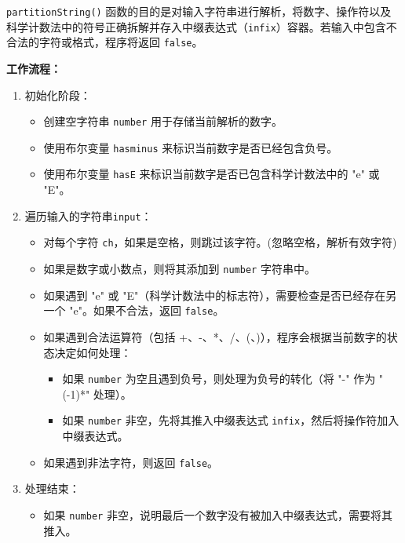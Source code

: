\documentclass[UTF8]{ctexart}
\begin{document}
\texttt{partitionString()} 函数的目的是对输入字符串进行解析，将数字、操作符以及科学计数法中的符号正确拆解并存入中缀表达式（\texttt{infix}）容器。若输入中包含不合法的字符或格式，程序将返回 \texttt{false}。

\textbf{工作流程：}
\begin{enumerate}
    \item 初始化阶段：
    \begin{itemize}
        \item 创建空字符串 \texttt{number} 用于存储当前解析的数字。
        \item 使用布尔变量 \texttt{hasminus} 来标识当前数字是否已经包含负号。
        \item 使用布尔变量 \texttt{hasE} 来标识当前数字是否已包含科学计数法中的 "e" 或 "E"。
    \end{itemize}

    \item 遍历输入的字符串\texttt{input}：
    \begin{itemize}
        \item 对每个字符 \texttt{ch}，如果是空格，则跳过该字符。(忽略空格，解析有效字符)
        \item 如果是数字或小数点，则将其添加到 \texttt{number} 字符串中。
        \item 如果遇到 "e" 或 "E"（科学计数法中的标志符），需要检查是否已经存在另一个 "e"。如果不合法，返回 \texttt{false}。
        \item 如果遇到合法运算符（包括 +、-、*、/、(、)），程序会根据当前数字的状态决定如何处理：
        \begin{itemize}
            \item 如果 \texttt{number} 为空且遇到负号，则处理为负号的转化（将 "-" 作为 "(-1)*" 处理）。
            \item 如果 \texttt{number} 非空，先将其推入中缀表达式 \texttt{infix}，然后将操作符加入中缀表达式。
        \end{itemize}
        \item 如果遇到非法字符，则返回 \texttt{false}。
    \end{itemize}

    \item 处理结束：
    \begin{itemize}
        \item 如果 \texttt{number} 非空，说明最后一个数字没有被加入中缀表达式，需要将其推入。
    \end{itemize}

\end{enumerate}
\end{document}
